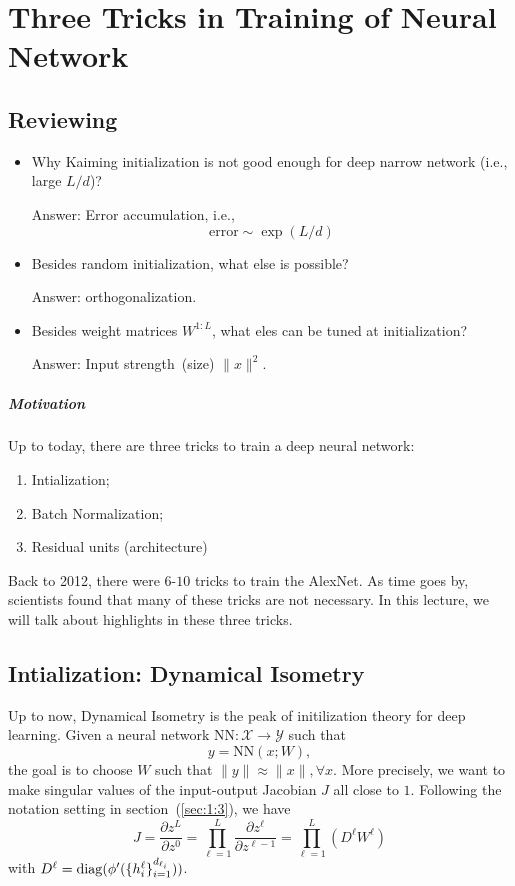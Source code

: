 \chapter{Three Tricks in Training of Neural Network}

\section{Reviewing}
\begin{itemize}
\item
Why Kaiming initialization is not good enough for deep narrow network (i.e., large $L/d$)?

Answer:
Error accumulation, i.e.,
\[
\text{error}\sim\exp(L/d)
\]
\item
Besides random initialization, what else is possible?

Answer: 
orthogonalization.
\item
Besides weight matrices $ W^{1:L}$, what eles can be tuned at initialization?

Answer: 
Input strength~(size) $\|x\|^2$.
\end{itemize}

\paragraph{Motivation}
Up to today, there are three tricks to train a deep neural network:
\begin{enumerate}
\item
Intialization;
\item
Batch Normalization;
\item
Residual units (architecture)
\end{enumerate}
Back to 2012, there were  $6$-$10$ tricks to train the AlexNet. As time goes by, scientists found that many of these tricks are not necessary.
In this lecture, we will talk about highlights in these three tricks.

\section{Intialization: Dynamical Isometry}
Up to now, Dynamical Isometry is the peak of initilization theory for deep learning.
Given a neural network $\text{NN}:\mathcal{X}\to\mathcal{Y}$ such that
\[
y = \text{NN}(x;W),
\]
the goal is to choose $W$ such that $\|y\|\approx \|x\|,\forall x$. More precisely, we want to make singular values of the input-output Jacobian $J$ all close to $1$.
Following the notation setting in section~(\ref{sec:1:3}), we have
\[
J=\frac{\partial z^L}{\partial z^0} = \prod_{\ell=1}^L\frac{\partial z^{\ell}}{\partial z^{\ell-1}} = \prod_{\ell=1}^L(D^{\ell}W^{\ell})
\]
with $D^{\ell} = \operatorname{diag}(\phi'(\{h_i^{\ell}\}_{i=1}^{d_{\ell_i}}))$.

